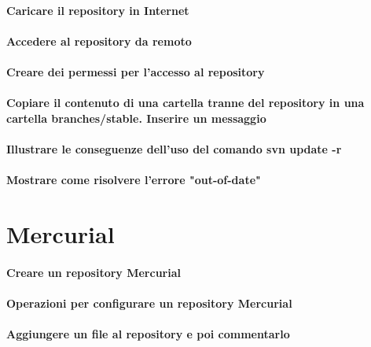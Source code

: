 \documentclass[a4paper]{article}
\begin{document}
	\paragraph{Caricare il repository in Internet}
	
	\paragraph{Accedere al repository da remoto}
	
	\paragraph{Creare dei permessi per l'accesso al repository}
	
	\paragraph{Copiare il contenuto di una cartella tranne del repository in una cartella branches/stable. Inserire un messaggio}

	\paragraph{Illustrare le conseguenze dell'uso del comando svn update -r}
	
	\paragraph{Mostrare come risolvere l'errore "out-of-date"}	
	

	
	\section{Mercurial} %
	
		\paragraph{Creare un repository Mercurial}
		
		\paragraph{Operazioni per configurare un repository Mercurial}
		
		\paragraph{Aggiungere un file al repository e poi commentarlo}	
		
\end{document}
